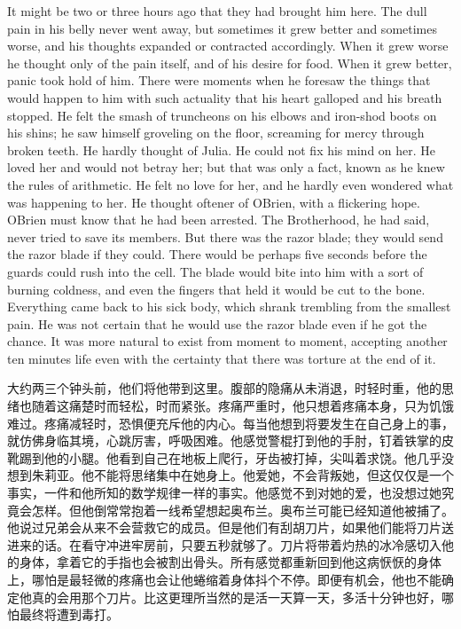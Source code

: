 \begin{paracol}{2}
It might be two or three hours ago that they had brought him here. The
dull pain in his belly never went away, but sometimes it grew better and
sometimes worse, and his thoughts expanded or contracted accordingly.
When it grew worse he thought only of the pain itself, and of his desire
for food. When it grew better, panic took hold of him. There were
moments when he foresaw the things that would happen to him with such
actuality that his heart galloped and his breath stopped. He felt the
smash of truncheons on his elbows and iron-shod boots on his shins; he
saw himself groveling on the floor, screaming for mercy through broken
teeth. He hardly thought of Julia. He could not fix his mind on her. He
loved her and would not betray her; but that was only a fact, known as
he knew the rules of arithmetic. He felt no love for her, and he hardly
even wondered what was happening to her. He thought oftener of
O\textquotesingle Brien, with a flickering hope. O\textquotesingle Brien
must know that he had been arrested. The Brotherhood, he had said, never
tried to save its members. But there was the razor blade; they would
send the razor blade if they could. There would be perhaps five seconds
before the guards could rush into the cell. The blade would bite into
him with a sort of burning coldness, and even the fingers that held it
would be cut to the bone. Everything came back to his sick body, which
shrank trembling from the smallest pain. He was not certain that he
would use the razor blade even if he got the chance. It was more natural
to exist from moment to moment, accepting another ten
minutes\textquotesingle{} life even with the certainty that there was
torture at the end of it.

\switchcolumn

大约两三个钟头前，他们将他带到这里。腹部的隐痛从未消退，时轻时重，他的思绪也随着这痛楚时而轻松，时而紧张。疼痛严重时，他只想着疼痛本身，只为饥饿难过。疼痛减轻时，恐惧便充斥他的内心。每当他想到将要发生在自己身上的事，就仿佛身临其境，心跳厉害，呼吸困难。他感觉警棍打到他的手肘，钉着铁掌的皮靴踢到他的小腿。他看到自己在地板上爬行，牙齿被打掉，尖叫着求饶。他几乎没想到朱莉亚。他不能将思绪集中在她身上。他爱她，不会背叛她，但这仅仅是一个事实，一件和他所知的数学规律一样的事实。他感觉不到对她的爱，也没想过她究竟会怎样。但他倒常常抱着一线希望想起奥布兰。奥布兰可能已经知道他被捕了。他说过兄弟会从来不会营救它的成员。但是他们有刮胡刀片，如果他们能将刀片送进来的话。在看守冲进牢房前，只要五秒就够了。刀片将带着灼热的冰冷感切入他的身体，拿着它的手指也会被割出骨头。所有感觉都重新回到他这病恹恹的身体上，哪怕是最轻微的疼痛也会让他蜷缩着身体抖个不停。即便有机会，他也不能确定他真的会用那个刀片。比这更理所当然的是活一天算一天，多活十分钟也好，哪怕最终将遭到毒打。


\end{paracol}
